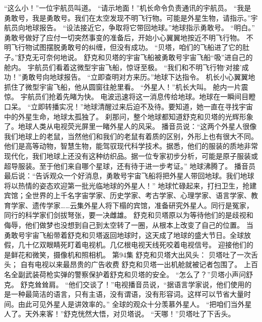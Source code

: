\documentclass[a4paper,12pt,UTF8,twoside]{ctexbook}
\begin{document}
        “这么小！”一位宇航员叫道。 
        “请示地面！”机长命令负责通讯的宇航员。 
        “我是勇敢号，我是勇敢号。我们在太空发现不明飞行物。可能是外星生物，请指示。”宇航员向地球报告。 
        “设法接近它，争取将它带回地球。”地球指示勇敢号。 
        “明白。” 
        勇敢号做好了应付一切突然事变的准备后，开始小心翼翼地按近不明飞行物。 
        不明飞行物试图摆脱勇敢号的纠缠，但没有成功。 
        “贝塔，咱们的飞船进了它的肚子。”舒克无可奈何地说。 
        舒克和贝塔的宇宙飞船被勇敢号宇宙飞船“吸”进自己的舱内。 
        宇航员们看着这微型宇宙飞船，惊讶至极。 
        “我们和不明飞行物‘对接’成功！”勇敢号向地球报告。 
        “立即查明对方来历。”地球下达指令。 
        机长小心翼翼地抓住了微型宇宙飞船，他从圆窗往舱里看。 
        “外星人！”机长大叫。 
        舱内一片震惊。 
        宇航员们抢着先睹为快。 
        电波迅速将这一消息传给地球。地球在一瞬间目瞪口呆。 
        “立即转播实况！”地球清醒过来后迫不及待。要知道，她一直在寻找宇宙中的外星生命，地球太孤独了。 
        刹那问，整个地球都知道舒克和贝塔的光辉形象了。地球人类从电视荧光屏里一睹外星人的风采。 
        播音员说：“这两个外星人很像我们地球上的老鼠，当然他们和我们的老鼠有着质的区别，外形上也有很大不同。他们是高等动物，智慧生物，能驾驭现代科学技术。据悉，他们的服装的质地非常现代化，我们地球上还没有这种纺织品。据一位专家初步分析，可能是原子服装或超导服装。至于他们来自哪个星球，还有待于进一步考证。” 
        地球沸腾了。 
        播音员最后说：“告诉观众一个好消息，勇敢号宇宙飞船将把外星人带回地球。我们地球将以热情的姿态欢迎第一批光临地球的外星人！” 
        地球忙碌起来，打扫卫生，抢建宾馆；全世界的上千名字宙学家、历史学家、考古学家、心理学家、语言学家、教育学家、遗传学家……云集外星人将下榻的宾馆，准备研究外星人。同行是冤家，同行的科学家们剑拔弩张，要一决雌雄。 
        舒克和贝塔原以为等待他们的是歧视和侮辱，他们做梦也没想到自己到太空转了一圈，从根本上改变了自己的位置。 
        当勇敢号宇宙飞船带着舒克和贝塔返回地球时，这天成了地球的盛大节日。全球放假，几十亿双眼睛死盯着电视机。几亿根电视天线死咬着电视信号。 
        迎接他们的是鲜花和微笑，摄像机和照相机。   第94集 
        舒克和贝塔大出风头： 
        贝塔吐了一次舌头； 
        自有电视以来最昂贵的广告收费   
        舒克和贝塔一出机舱就被记者包围了。 
        上百名全副武装荷枪实弹的警察保护着舒克和贝塔的安全。 
        “怎么了？”贝塔小声问舒克。 
        舒克耸耸肩。 
        “他们交谈了！”电视播音员说，“据语言学家说，他们使用的是一种最简洁的语言，只有主语，没有谓语，没有形容词。这样可以节省大量时间。由此可见外星人是讲效率的。” 
        全球的观众十分羡慕外星人。 
        “把咱们当外星人了。天外来客！”舒克恍然大悟，对贝塔说。 
        “天哪！”贝塔吐了下舌头。 
\end{document}

